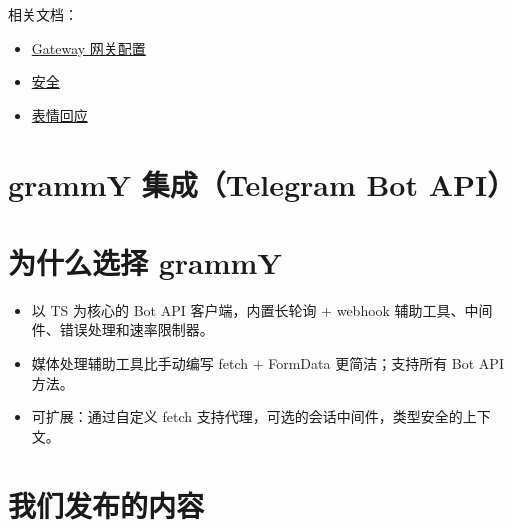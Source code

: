 相关文档：

\begin{itemize}
  \item \href{/gateway/configuration}{Gateway 网关配置}
  \item \href{/gateway/security}{安全}
  \item \href{/tools/reactions}{表情回应}
\end{itemize}



\clearpage

\section{grammY 集成（Telegram Bot API）}


\section{为什么选择 grammY}


\begin{itemize}
  \item 以 TS 为核心的 Bot API 客户端，内置长轮询 + webhook 辅助工具、中间件、错误处理和速率限制器。
  \item 媒体处理辅助工具比手动编写 fetch + FormData 更简洁；支持所有 Bot API 方法。
  \item 可扩展：通过自定义 fetch 支持代理，可选的会话中间件，类型安全的上下文。
\end{itemize}


\section{我们发布的内容}


